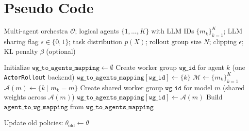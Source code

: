 \documentclass[]{fairmeta}
\theoremstyle{plain}
\theoremstyle{definition}
\theoremstyle{remark}
\newcommand{\methodname}{Dr.\ MAS}
\begin{document}
\section{Pseudo Code}
\label{app:pseudocode}
\begin{algorithm}[H]
\caption{Training Multi-Agent LLM Systems with \methodname{}}
\label{alg:pseudocode}
\begin{algorithmic}[1]
 Multi-agent orchestra $\mathcal{O}$; logical agents $\{1,\dots,K\}$ with LLM IDs $\{m_k\}_{k=1}^K$;
LLM sharing flag $s\in\{0,1\}$;
task distribution $p(X)$; rollout group size $N$;
clipping $\epsilon$; KL penalty $\beta$ (optional)

\vspace{0.5em}
\STATE \small{}
\STATE Initialize $\texttt{wg\_to\_agents\_mapping}\leftarrow \emptyset$
    \STATE \small{\color{gray}{// Non-sharing: each agent $k$ has a dedicated LLM worker group}}
        \STATE Create worker group $\texttt{wg\_id}$ for agent $k$ (one \texttt{ActorRollout} backend)
        \STATE $\texttt{wg\_to\_agents\_mapping}[\texttt{wg\_id}] \leftarrow \{k\}$
    \ENDFOR
\ELSE
    \STATE \small{\color{gray}{// Sharing: agents configured with the same LLM are mapped to one shared worker group}}
    \STATE $\mathcal{M}\leftarrow \{m_k\}_{k=1}^K$ \small{\color{gray}{// distinct LLM IDs}}
        \STATE $\mathcal{A}(m)\leftarrow \{k \mid m_k=m\}$ \small{\color{gray}{// agents using LLM $m$}}
        \STATE Create shared worker group $\texttt{wg\_id}$ for model $m$ (shared weights across $\mathcal{A}(m)$)
        \STATE $\texttt{wg\_to\_agents\_mapping}[\texttt{wg\_id}] \leftarrow \mathcal{A}(m)$
    \ENDFOR
\ENDIF
\STATE \small{}
\STATE Build $\texttt{agent\_to\_wg\_mapping}$ from $\texttt{wg\_to\_agents\_mapping}$

\vspace{0.5em}
\STATE \small{}
    \STATE \small{\color{gray}{// Snapshot current policy for importance ratios}}
    \STATE Update old policies: $\theta_{\text{old}}\leftarrow \theta$


\end{algorithmic}
\end{algorithm}
\end{document}
